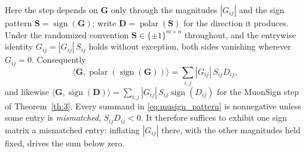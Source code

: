 Here the step depends on $\mathbf{G}$ only through the magnitudes $|G_{ij}|$ and the sign pattern $\mathbf{S}=\operatorname{sign}(\mathbf{G})$; write $\mathbf{D}=\operatorname{polar}(\mathbf{S})$ for the direction it produces. Under the randomized convention $\mathbf{S}\in\{\pm1\}^{m\times n}$ throughout, and the entrywise identity $G_{ij}=|G_{ij}|\,S_{ij}$ holds without exception, both sides vanishing wherever $G_{ij}=0$. Consequently
\begin{equation}\label{eq:musign_pattern}
\bigl\langle\mathbf{G},\operatorname{polar}(\operatorname{sign}(\mathbf{G}))\bigr\rangle=\textstyle\sum_{i,j}|G_{ij}|\,S_{ij}D_{ij},
\end{equation}
and likewise $\langle\mathbf{G},\operatorname{sign}(\mathbf{D})\rangle=\sum_{i,j}|G_{ij}|\,S_{ij}\operatorname{sign}(D_{ij})$ for the MuonSign step of Theorem~\ref{th:3}. Every summand in \eqref{eq:musign_pattern} is nonnegative unless some entry is \emph{mismatched}, $S_{ij}D_{ij}<0$. It therefore suffices to exhibit one sign matrix  a mismatched entry: inflating $|G_{ij}|$ there, with the other magnitudes held fixed, drives the sum below zero.

